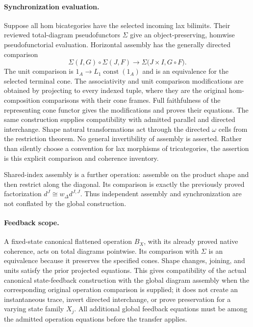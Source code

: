 \documentclass{article}
\begin{document}
\paragraph{Synchronization evaluation.} Suppose all hom bicategories have the selected incoming lax bilimits. Their reviewed total-diagram pseudofunctors $\Sigma$ give an object-preserving, homwise pseudofunctorial evaluation. Horizontal assembly has the generally directed comparison
\[
 \Sigma(I,G)\circ\Sigma(J,F)\longrightarrow
 \Sigma\bigl(J\times I,G\circ F\bigr).
\]
The unit comparison is $1_A\to L_1\operatorname{const}(1_A)$ and is an equivalence for the selected terminal cone. The associativity and unit comparison modifications are obtained by projecting to every indexed tuple, where they are the original hom-composition comparisons with their cone frames. Full faithfulness of the representing cone functor gives the modifications and proves their equations. The same construction supplies compatibility with admitted parallel and directed interchange. Shape natural transformations act through the directed $\omega$ cells from the restriction theorem. No general invertibility of assembly is asserted. Rather than silently choose a convention for lax morphisms of tricategories, the assertion is this explicit comparison and coherence inventory.

Shared-index assembly is a further operation: assemble on the product shape and then restrict along the diagonal. Its comparison is exactly the previously proved factorization $d^J\cong w_\Delta d^{J,J}$. Thus independent assembly and synchronization are not conflated by the global construction.

\paragraph{Feedback scope.} A fixed-state canonical flattened operation $B_X$, with its already proved native coherence, acts on total diagrams pointwise. Its comparison with $\Sigma$ is an equivalence because it preserves the specified cones. Shape changes, joining, and units satisfy the prior projected equations. This gives compatibility of the actual canonical state-feedback construction with the global diagram assembly when the corresponding original operation comparison is supplied; it does not create an instantaneous trace, invert directed interchange, or prove preservation for a varying state family $X_j$. All additional global feedback equations must be among the admitted operation equations before the transfer applies.
\end{document}
